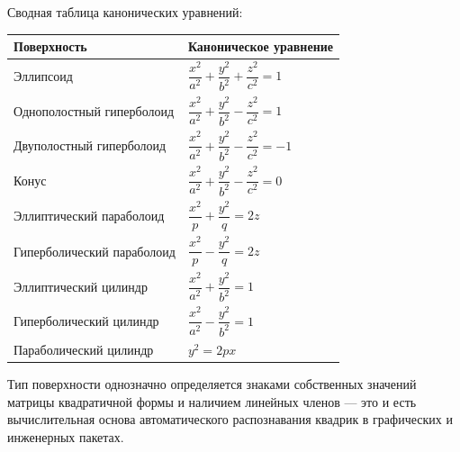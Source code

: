\documentclass[12pt,a4paper]{article}
\begin{document}
Сводная таблица канонических уравнений:
\begin{center}
  \begin{tabular}{l l}
    \hline
    \textbf{Поверхность} & \textbf{Каноническое уравнение} \\
    \hline
    Эллипсоид & $\dfrac{x^2}{a^2}+\dfrac{y^2}{b^2}+\dfrac{z^2}{c^2}=1$ \\[2mm]
    Однополостный гиперболоид &
    $\dfrac{x^2}{a^2}+\dfrac{y^2}{b^2}-\dfrac{z^2}{c^2}=1$ \\[2mm]
    Двуполостный гиперболоид &
    $\dfrac{x^2}{a^2}+\dfrac{y^2}{b^2}-\dfrac{z^2}{c^2}=-1$ \\[2mm]
    Конус & $\dfrac{x^2}{a^2}+\dfrac{y^2}{b^2}-\dfrac{z^2}{c^2}=0$ \\[2mm]
    Эллиптический параболоид & $\dfrac{x^2}{p}+\dfrac{y^2}{q}=2z$ \\[2mm]
    Гиперболический параболоид & $\dfrac{x^2}{p}-\dfrac{y^2}{q}=2z$ \\[2mm]
    Эллиптический цилиндр & $\dfrac{x^2}{a^2}+\dfrac{y^2}{b^2}=1$ \\[2mm]
    Гиперболический цилиндр & $\dfrac{x^2}{a^2}-\dfrac{y^2}{b^2}=1$ \\[2mm]
    Параболический цилиндр & $y^2=2px$ \\
    \hline
  \end{tabular}
\end{center}

Тип поверхности однозначно определяется знаками собственных значений
матрицы квадратичной формы и наличием линейных членов — это и есть
вычислительная основа автоматического распознавания квадрик в
графических и инженерных пакетах.
\end{document}
